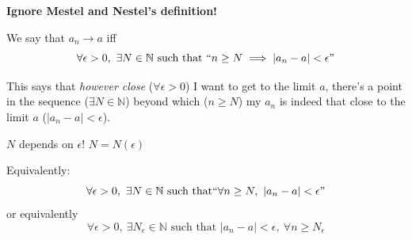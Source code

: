 \documentclass[10pt,twoside]{scrartcl}
\begin{document}
\textbf{Ignore Mestel and Nestel's definition!}\\

\begin{definition}[Convergence]
We say that $a_n \to a$ iff 
\[\forall \epsilon >0,~\exists N \in \mathbb{N} \text{ such that } ``n \geq N \implies |a_n - a| < \epsilon"\]	
\end{definition}

This says that \emph{however close} ($\forall \epsilon>0$) I want to get to the limit $a$, there's a point in the sequence ($\exists N \in \mathbb{N}$) beyond which ($n \geq N$) my $a_n$ is indeed that close to the limit $a$ ($|a_n - a| <\epsilon$).\\ 

\begin{remark}
$N$ depends on $\epsilon$! $N = N(\epsilon)$	
\end{remark}

Equivalently:
\[\forall \epsilon >0,~ \exists N \in \mathbb{N} \text{ such that} ``\forall n \geq N,~|a_n -a|<\epsilon"\]
or equivalently
\[\forall \epsilon >0,~\exists N_\epsilon\in\mathbb{N} \text{ such that } |a_n - a| < \epsilon,~\forall n \geq N_\epsilon\]\vspace*{5pt}
\end{document}
